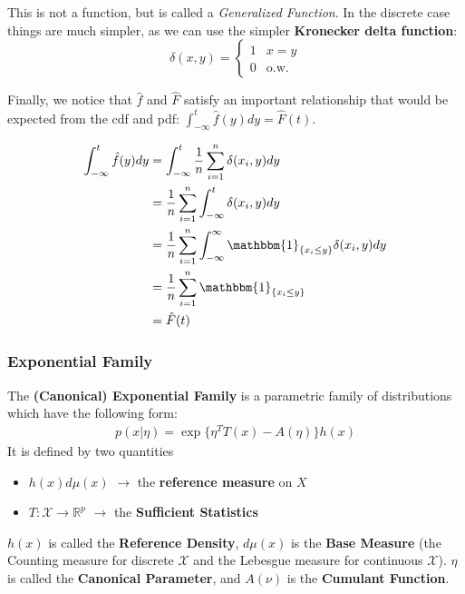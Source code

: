 \documentclass[]{article}
\theoremstyle{mattstyle}
\theoremstyle{definition}
\begin{document}
This is not a function, but is called a \emph{Generalized Function}. In the discrete case things are much simpler, as we can use the simpler \textbf{Kronecker delta function}:
\begin{equation}
	\delta(x,y) = 
	\begin{cases}
		1 & x=y \\
		0 & \text{o.w.}
	\end{cases}
\end{equation}

Finally, we notice that $\hat{f}$ and $\hat{F}$ satisfy an important relationship that would be expected from the cdf and pdf: $\int_{-\infty}^{t}\hat{f}(y)dy = \hat{F}(t)$.

\begin{align*}
\int_{-\infty}^{t}\hat{f}(y)dy &= \int_{-\infty}^{t} \frac{1}{n}\sum_{i=1}^n \delta(x_i, y)dy\\
&= \frac{1}{n}\sum_{i=1}^n \int_{-\infty}^{t}  \delta(x_i, y)dy\\
&= \frac{1}{n}\sum_{i=1}^n \int_{-\infty}^{\infty} \mathbbm{1}_{\{x_i \le y\}} \delta(x_i, y)dy\\
&= \frac{1}{n}\sum_{i=1}^n \mathbbm{1}_{\{x_i \le y\}}\\
&= \hat{F}(t)
\end{align*}

\subsubsection{Exponential Family}\label{sec:expfam}

The \textbf{(Canonical) Exponential Family} is a parametric family of distributions which have the following form:
\begin{align*}
p(x|\eta) = \exp\{ \eta^TT(x) - A(\eta)\}h(x)
\end{align*}
It is defined by two quantities
\begin{itemize}
	\item $h(x)d\mu(x)$ $\rightarrow$ the \textbf{reference measure} on $X$
	\item $T: \mathcal{X} \rightarrow \mathbb{R}^p$ $\rightarrow$ the \textbf{Sufficient Statistics}
\end{itemize}

$h(x)$ is called the \textbf{Reference Density}, $d\mu(x)$ is the \textbf{Base Measure} (the Counting measure for discrete $\mathcal{X}$ and the Lebesgue measure for continuous $\mathcal{X}$). $\eta$ is called the \textbf{Canonical Parameter},  and $A(\nu)$ is the \textbf{Cumulant Function}.
\end{document}
